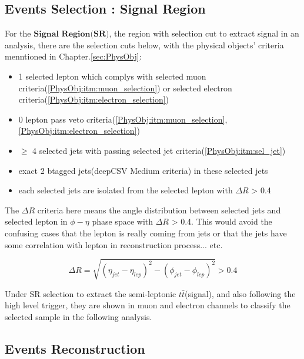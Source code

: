 
	\subsection{Events Selection : Signal Region}
	\label{ssec:EvtSel_SR}

		For the $\textbf{Signal Region(SR)}$, the region with selection cut to extract signal in an analysis, there are the selection cuts below, with the physical objects' criteria menntioned in Chapter.\ref{sec:PhysObj}:

		\begin{itemize}
	  		\item 1 selected lepton which complys with selected muon criteria(\ref{PhysObj:itm:muon_selection}) or selected electron criteria(\ref{PhysObj:itm:electron_selection})
	  		\item 0 lepton pass veto criteria(\ref{PhysObj:itm:muon_selection},\ref{PhysObj:itm:electron_selection})
	  		\item $\geq$ 4 selected jets with passing selected jet criteria(\ref{PhysObj:itm:sel_jet})
	  		\item exact 2 btagged jets(deepCSV Medium criteria) in these selected jets
	  		\item each selected jets are isolated from the selected lepton with $\Delta R$ > 0.4
	  	\label{EventSelReco:itm:full_sel}
		\end{itemize}

		The $\Delta R$ criteria here means the angle distribution between selected jets and selected lepton in $\phi - \eta$ phase space with $\Delta R$ > 0.4. This would avoid the confusing cases that the lepton is really coming from jets or that the jets have some correlation with lepton in reconstruction process... etc.

		\begin{equation}
		\Delta R = \sqrt{ (\eta_{jet} - \eta_{lep})^2 - (\phi_{jet} - \phi_{lep})^2 } > 0.4
		\end{equation}

		Under SR selection to extract the semi-leptonic $t\bar{t}$(signal), and also following the high level trigger, they are shown in muon and electron channels to classify the selected sample in the following analysis.

	\subsection{Events Reconstruction}
	\label{ssec:EvtReco}


